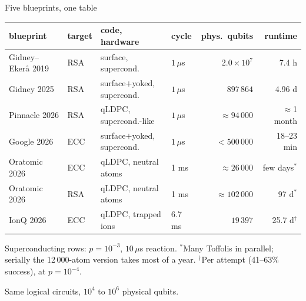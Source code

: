 \documentclass[aspectratio=169,11pt]{beamer}
\begin{document}
\begin{frame}{Five blueprints, one table}
  \centering\small
  \renewcommand{\arraystretch}{1.2}
  \begin{tabular}{@{}llllrr@{}}
    \toprule
    blueprint & target & code, hardware & cycle & phys.\ qubits & runtime \\
    \midrule
    Gidney--Ekerå 2019 & RSA & surface, supercond. & $1\,\mu$s & $2.0\times10^7$ & 7.4 h \\
    Gidney 2025 & RSA & surface$+$yoked, supercond. & $1\,\mu$s & $897\,864$ & 4.96 d \\
    Pinnacle 2026 & RSA & qLDPC, supercond.-like & $1\,\mu$s & $\approx94\,000$ & $\approx$1 month \\
    Google 2026 & ECC & surface$+$yoked, supercond. & $1\,\mu$s & $<500\,000$ & 18--23 min \\
    Oratomic 2026 & ECC & qLDPC, neutral atoms & 1 ms & $\approx26\,000$ & few days$^\ast$ \\
    Oratomic 2026 & RSA & qLDPC, neutral atoms & 1 ms & $\approx102\,000$ & 97 d$^\ast$ \\
    IonQ 2026 & ECC & qLDPC, trapped ions & 6.7 ms & $19\,397$ & 25.7 d$^\dagger$ \\
    \bottomrule
  \end{tabular}
  \vskip2mm
  \raggedright{\footnotesize Superconducting rows: $p=10^{-3}$, $10\,\mu$s reaction. $^\ast$Many Toffolis in parallel; serially the 12\,000-atom version takes most of a year. $^\dagger$Per attempt (41--63\% success), at $p=10^{-4}$.}
  \begin{takeaway}Same logical circuits, $10^4$ to $10^6$ physical qubits.\end{takeaway}
\end{frame}
\end{document}
